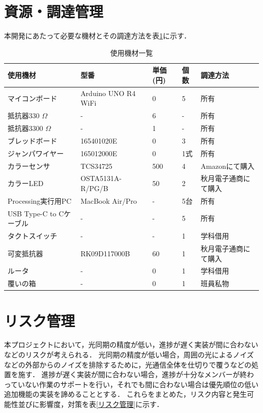 \documentclass[lualatex,book,openany,paper=a4paper,jafontsize=11.5pt,jafontscale=1.05]{jlreq}
\begin{document}
\section{資源・調達管理}
本開発にあたって必要な機材とその調達方法を表\ref{使用機材}に示す．
\begin{table}
 \begin{center}
   \caption{使用機材一覧}
   \label{使用機材}
  \begin{tabular}{|l|l|l|l|l|}
	\hline
    使用機材&型番& 単価(円) & 個数 &調達方法\\\hline
    マイコンボード&Arduino UNO R4 WiFi& 0 & 5 &所有 \\\hline
	  抵抗器330 $\Omega$&-& 6 & - &所有 \\\hline
    抵抗器3300 $\Omega$&-& 1 & - &所有 \\\hline
	  ブレッドボード & 165401020E & 0 & 3 & 所有 \\\hline
    ジャンパワイヤー & 165012000E & 0 & 1式 & 所有 \\\hline
	  カラーセンサ&TCS34725&500&4&Amazonにて購入\\\hline
	  カラーLED&OSTA5131A-R/PG/B& 50 &2&秋月電子通商にて購入\\\hline
	  Processing実行用PC&MacBook Air/Pro& - & 5台 & 所有\\\hline
	  USB Type-C to Cケーブル & - & - &  5 & 所有\\\hline
    タクトスイッチ & - & - &  1 & 学科借用\\\hline
    可変抵抗器 & RK09D117000B & 60 &  1 & 秋月電子通商にて購入\\\hline
    ルータ & - & 0 &  1 & 学科借用\\\hline
    覆いの箱 & - & 0 & 1 & 班員私物\\\hline
  \end{tabular}
 \end{center}
\end{table}

\clearpage
\section{リスク管理}
本プロジェクトにおいて，光同期の精度が低い，進捗が遅く実装が間に合わないなどのリスクが考えられる．
光同期の精度が低い場合，周囲の光によるノイズなどの外部からのノイズを排除するために，光通信全体を仕切りで覆うなどの処置を施す．
進捗が遅く実装が間に合わない場合，進捗が十分なメンバーが終わっていない作業のサポートを行い，それでも間に合わない場合は優先順位の低い追加機能の実装を諦めることとする．
これらをまとめた，リスク内容と発生可能性並びに影響度，対策を表\ref{リスク管理}に示す．
\end{document}
